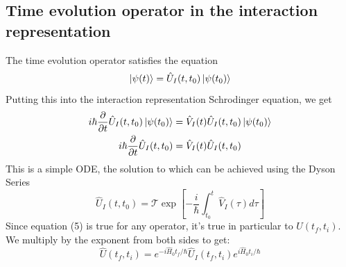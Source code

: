 \documentclass{article}
\begin{document}
\subsection{Time evolution operator in the interaction representation}
The time evolution operator satisfies the equation
\begin{equation}
    \ket{\psi(t)} = \hat{U}_I(t, t_0) \ket{\psi(t_0)}
\end{equation}
Putting this into the interaction representation Schrodinger equation, we get
\begin{equation}
\begin{gathered}
    i\hbar\frac{\partial}{\partial t}\hat{U}_I(t, t_0) \ket{\psi(t_0)} = \hat{V}_I(t) \hat{U}_I(t, t_0) \ket{\psi(t_0)}
    \\
    i\hbar\frac{\partial}{\partial t}\hat{U}_I(t, t_0) = \hat{V}_I(t) \hat{U}_I(t, t_0)
\end{gathered}
\end{equation}
This is a simple ODE, the solution to which can be achieved using the Dyson Series
\begin{equation}
    \hat{U}_I(t,t_0) = \mathcal T \exp\left[-\frac{i}{\hbar} \int_{t_0}^{t} \hat{V}_I(\tau) d\tau\right]
\end{equation}
Since equation (5) is true for any operator, it's true in particular to $U(t_f, t_i)$. We multiply by the exponent from both sides to get:
\begin{equation}
    \hat{U}(t_f, t_i) = e^{-i \hat{H}_0 t_f / \hbar}\hat{U}_I(t_f,t_i)e^{i \hat{H}_0 t_i / \hbar}
\end{equation}
\end{document}
